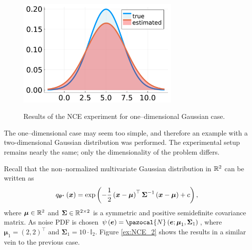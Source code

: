 \begin{example}
\begin{figure}[h]
	{{\includegraphics[width=8.0cm]{plots/Images/NCE_reselts2.pdf} }}%
	\caption{Results of the NCE experiment for one--dimensional Gaussian case.}%
	\label{ex:NCE_1}%
\end{figure}
\end{example}

\begin{example}
The one--dimensional case may seem too simple, and therefore an example with a two-dimensional Gaussian distribution was performed. The experimental setup remains nearly the same; only the dimensionality of the problem differs. 

Recall that the non--normalized multivariate Gaussian distribution in $\mathbb{R}^2$ can be written as
\begin{equation}
   q_{\boldsymbol{\theta}^\star}\left(\boldsymbol{x}\right) = \exp\left(-\frac{1}{2}\left(\boldsymbol{x} - \boldsymbol{\mu}\right)^\top\boldsymbol{\Sigma}^{-1}\left(\boldsymbol{x} - \boldsymbol{\mu}\right)+ c \right),
\end{equation}
where $\boldsymbol{\mu} \in \mathbb{R}^2$ and $\boldsymbol{\Sigma}\in \mathbb{R}^{2\times 2}$ is a symmetric and positive semidefinite covariance matrix. As noise PDF is chosen 
$\psi\left(\boldsymbol{e}\right)=\pazocal{N}\left(\boldsymbol{e}; \boldsymbol{\mu}_1,\boldsymbol{\Sigma}_1\right)$, where $\boldsymbol{\mu}_1 = \left(2,2\right)^\top$ and $\boldsymbol{\Sigma}_1=10\cdot\mathbb{I}_2$. Figure \ref{ex:NCE_2} shows the results in a similar vein to the previous case.


\end{example}
